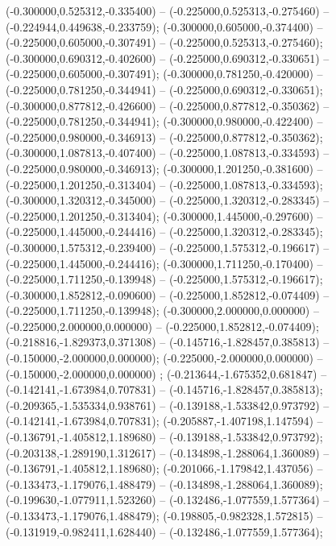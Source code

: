  (-0.300000,0.525312,-0.335400) -- (-0.225000,0.525313,-0.275460) -- (-0.224944,0.449638,-0.233759);
 (-0.300000,0.605000,-0.374400) -- (-0.225000,0.605000,-0.307491) -- (-0.225000,0.525313,-0.275460);
 (-0.300000,0.690312,-0.402600) -- (-0.225000,0.690312,-0.330651) -- (-0.225000,0.605000,-0.307491);
 (-0.300000,0.781250,-0.420000) -- (-0.225000,0.781250,-0.344941) -- (-0.225000,0.690312,-0.330651);
 (-0.300000,0.877812,-0.426600) -- (-0.225000,0.877812,-0.350362) -- (-0.225000,0.781250,-0.344941);
 (-0.300000,0.980000,-0.422400) -- (-0.225000,0.980000,-0.346913) -- (-0.225000,0.877812,-0.350362);
 (-0.300000,1.087813,-0.407400) -- (-0.225000,1.087813,-0.334593) -- (-0.225000,0.980000,-0.346913);
 (-0.300000,1.201250,-0.381600) -- (-0.225000,1.201250,-0.313404) -- (-0.225000,1.087813,-0.334593);
 (-0.300000,1.320312,-0.345000) -- (-0.225000,1.320312,-0.283345) -- (-0.225000,1.201250,-0.313404);
 (-0.300000,1.445000,-0.297600) -- (-0.225000,1.445000,-0.244416) -- (-0.225000,1.320312,-0.283345);
 (-0.300000,1.575312,-0.239400) -- (-0.225000,1.575312,-0.196617) -- (-0.225000,1.445000,-0.244416);
 (-0.300000,1.711250,-0.170400) -- (-0.225000,1.711250,-0.139948) -- (-0.225000,1.575312,-0.196617);
 (-0.300000,1.852812,-0.090600) -- (-0.225000,1.852812,-0.074409) -- (-0.225000,1.711250,-0.139948);
 (-0.300000,2.000000,0.000000) -- (-0.225000,2.000000,0.000000) -- (-0.225000,1.852812,-0.074409);
 (-0.218816,-1.829373,0.371308) -- (-0.145716,-1.828457,0.385813) -- (-0.150000,-2.000000,0.000000);
 (-0.225000,-2.000000,0.000000) -- (-0.150000,-2.000000,0.000000) ;
 (-0.213644,-1.675352,0.681847) -- (-0.142141,-1.673984,0.707831) -- (-0.145716,-1.828457,0.385813);
 (-0.209365,-1.535334,0.938761) -- (-0.139188,-1.533842,0.973792) -- (-0.142141,-1.673984,0.707831);
 (-0.205887,-1.407198,1.147594) -- (-0.136791,-1.405812,1.189680) -- (-0.139188,-1.533842,0.973792);
 (-0.203138,-1.289190,1.312617) -- (-0.134898,-1.288064,1.360089) -- (-0.136791,-1.405812,1.189680);
 (-0.201066,-1.179842,1.437056) -- (-0.133473,-1.179076,1.488479) -- (-0.134898,-1.288064,1.360089);
 (-0.199630,-1.077911,1.523260) -- (-0.132486,-1.077559,1.577364) -- (-0.133473,-1.179076,1.488479);
 (-0.198805,-0.982328,1.572815) -- (-0.131919,-0.982411,1.628440) -- (-0.132486,-1.077559,1.577364);
